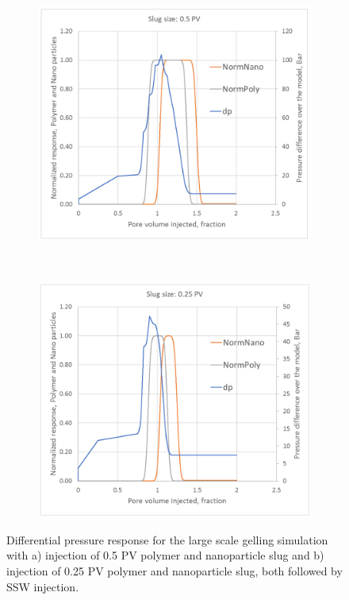 \documentclass[journal = enfuem, manuscript =  article]{achemso}
\begin{document}
\begin{figure}[h] %
    \begin{subfigure}{.5\textwidth}
    \centering
    \includegraphics[width=\textwidth]{fig/pDiff1.png}
    \caption{}
    \label{cht:pDiff1}
    \end{subfigure}
    \\
    \begin{subfigure}{.5\textwidth}
    \centering
    \includegraphics[width=\textwidth]{fig/pDiff2.png}
    \caption{}
    \label{cht:pDiff2}
    \end{subfigure}
    
    \caption{Differential pressure response for the large scale gelling simulation with a) injection of 0.5 PV polymer and nanoparticle slug and b) injection of 0.25 PV polymer and nanoparticle slug, both followed by SSW injection. }
    \label{cht:pDiff}
\end{figure}
\end{document}

